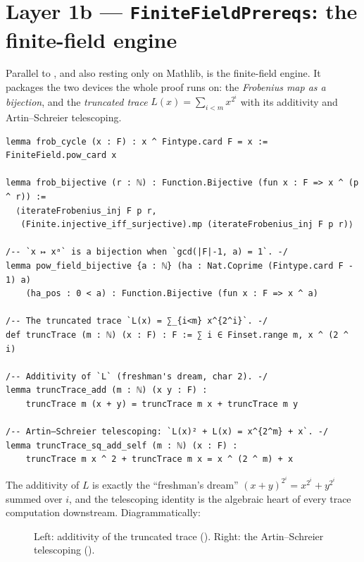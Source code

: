\documentclass[11pt]{article}
\theoremstyle{definition}
\begin{document}
\section{Layer 1b --- \texttt{FiniteFieldPrereqs}: the finite-field engine}

Parallel to , and also resting only on Mathlib, is the finite-field
engine.  It packages the two devices the whole proof runs on: the
\emph{Frobenius map as a bijection}, and the \emph{truncated trace}
$L(x)=\sum_{i<m}x^{2^i}$ with its additivity and Artin--Schreier telescoping.

\begin{lstlisting}
lemma frob_cycle (x : F) : x ^ Fintype.card F = x := FiniteField.pow_card x

lemma frob_bijective (r : ℕ) : Function.Bijective (fun x : F => x ^ (p ^ r)) :=
  ⟨iterateFrobenius_inj F p r,
   (Finite.injective_iff_surjective).mp (iterateFrobenius_inj F p r)⟩

/-- `x ↦ xᵃ` is a bijection when `gcd(|F|-1, a) = 1`. -/
lemma pow_field_bijective {a : ℕ} (ha : Nat.Coprime (Fintype.card F - 1) a)
    (ha_pos : 0 < a) : Function.Bijective (fun x : F => x ^ a)

/-- The truncated trace `L(x) = ∑_{i<m} x^{2^i}`. -/
def truncTrace (m : ℕ) (x : F) : F := ∑ i ∈ Finset.range m, x ^ (2 ^ i)

/-- Additivity of `L` (freshman's dream, char 2). -/
lemma truncTrace_add (m : ℕ) (x y : F) :
    truncTrace m (x + y) = truncTrace m x + truncTrace m y

/-- Artin–Schreier telescoping: `L(x)² + L(x) = x^{2^m} + x`. -/
lemma truncTrace_sq_add_self (m : ℕ) (x : F) :
    truncTrace m x ^ 2 + truncTrace m x = x ^ (2 ^ m) + x
\end{lstlisting}

The additivity of $L$ is exactly the ``freshman's dream'' $ (x+y)^{2^i}=x^{2^i}+y^{2^i}$
summed over $i$, and the telescoping identity is the algebraic heart of every
trace computation downstream.  Diagrammatically:

\begin{figure}[h]
\centering
{}
\qquad\qquad
{}
\caption{Left: additivity of the truncated trace ().
Right: the Artin--Schreier telescoping ().}
\end{figure}
\end{document}

